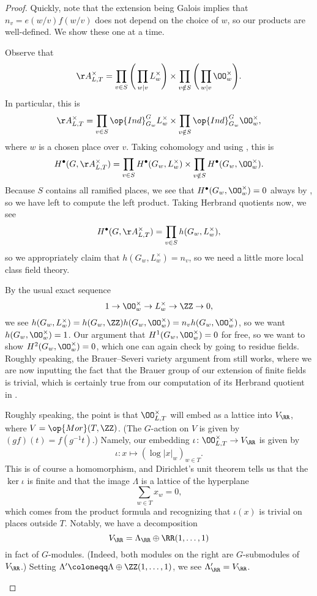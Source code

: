 \documentclass[../notes.tex]{subfiles}
\begin{document}
\begin{proof}
	Quickly, note that the extension being Galois implies that $n_v=e(w/v)f(w/v)$ does not depend on the choice of $w$, so our products are well-defined. We show these one at a time.
	\begin{listalph}
		\item Observe that
		\[\AA_{L,T}^\times=\prod_{v\in S}\Bigg(\prod_{w\mid v}L_w^\times\Bigg)\times\prod_{v\notin S}\Bigg(\prod_{w\mid v}\OO_w^\times\Bigg).\]
		In particular, this is
		\[\AA_{L,T}^\times=\prod_{v\in S}\op{Ind}^G_{G_w}L_w^\times\times\prod_{v\notin S}\op{Ind}_{G_w}^G\OO_w^\times,\]
		where $w$ is a chosen place over $v$. Taking cohomology and using , this is
		\[H^\bullet(G,\AA_{L,T}^\times)=\prod_{v\in S}H^\bullet(G_w,L_w^\times)\times\prod_{v\notin S}H^\bullet(G_w,\OO_w^\times).\]
		Because $S$ contains all ramified places, we see that $H^\bullet(G_w,\OO_w^\times)=0$ always by , so we have left to compute the left product. Taking Herbrand quotients now, we see
		\[H^\bullet(G,\AA_{L,T}^\times)=\prod_{v\in S}h(G_w,L_w^\times),\]
		so we appropriately claim that $h(G_w,L_w^\times)=n_v$, so we need a little more local class field theory.

		By the usual exact sequence
		\[1\to\OO_w^\times\to L_w^\times\to\ZZ\to0,\]
		we see $h(G_w,L_w^\times)=h(G_w,\ZZ)h(G_w,\OO_w^\times)=n_vh(G_w,\OO_w^\times)$, so we want $h(G_w,\OO_w^\times)=1$. Our argument that $H^1(G_w,\OO_w^\times)=0$ for free, so we want to show $H^2(G_w,\OO_w^\times)=0$, which one can again check by going to residue fields. Roughly speaking, the Brauer--Severi variety argument from  still works, where we are now inputting the fact that the Brauer group of our extension of finite fields is trivial, which is certainly true from our computation of its Herbrand quotient in .

		\item Roughly speaking, the point is that $\OO_{L,T}^\times$ will embed as a lattice into $V_\RR$, where $V=\op{Mor}(T,\ZZ)$. (The $G$-action on $V$ is given by $(gf)(t)=f\left(g^{-1}t\right)$.) Namely, our embedding $\iota\colon\OO_{L,T}^\times\to V_\RR$ is given by
		\[\iota\colon x\mapsto(\log|x|_w)_{w\in T}.\]
		This is of course a homomorphism, and Dirichlet's unit theorem tells us that the $\ker\iota$ is finite and that the image $\Lambda$ is a lattice of the hyperplane
		\[\sum_{w\in T}x_w=0,\]
		which comes from the product formula and recognizing that $\iota(x)$ is trivial on places outside $T$. Notably, we have a decomposition
		\[V_\RR=\Lambda_\RR\oplus\RR(1,\ldots,1)\]
		in fact of $G$-modules. (Indeed, both modules on the right are $G$-submodules of $V_\RR$.) Setting $\Lambda'\coloneqq\Lambda\oplus\ZZ(1,\ldots,1)$, we see $\Lambda'_\RR=V_\RR$.


\end{listalph}
\end{proof}
\end{document}
